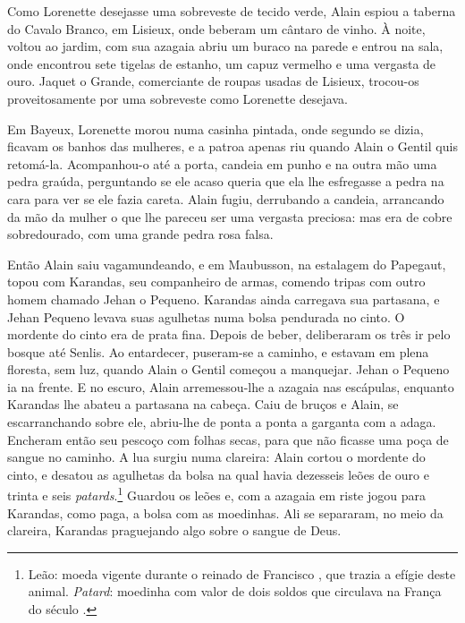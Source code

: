 Como Lorenette desejasse uma sobreveste de tecido verde, Alain espiou a
taberna do Cavalo Branco, em Lisieux, onde beberam um cântaro de vinho. À
noite, voltou ao jardim, com sua azagaia abriu um buraco na parede e
entrou na sala, onde encontrou sete tigelas de estanho, um capuz vermelho
e uma vergasta de ouro. Jaquet o Grande, comerciante de roupas usadas de
Lisieux, trocou-os proveitosamente por uma sobreveste como Lorenette
desejava.

Em Bayeux, Lorenette morou numa casinha pintada, onde segundo se dizia,
ficavam os banhos das mulheres, e a patroa apenas riu quando Alain o
Gentil quis retomá-la. Acompanhou-o até a porta, candeia em punho e na
outra mão uma pedra graúda, perguntando se ele acaso queria que ela lhe
esfregasse a pedra na cara para ver se ele fazia careta. Alain fugiu,
derrubando a candeia, arrancando da mão da mulher o que lhe pareceu ser
uma vergasta preciosa: mas era de cobre sobredourado, com uma grande pedra
rosa falsa.

Então Alain saiu vagamundeando, e em Maubusson, na estalagem do Papegaut,
topou com Karandas, seu companheiro de armas, comendo tripas com outro
homem chamado Jehan o Pequeno. Karandas ainda carregava sua partasana, e
Jehan Pequeno levava suas agulhetas numa bolsa pendurada no cinto. O
mordente do cinto era de prata fina. Depois de beber, deliberaram os três
ir pelo bosque até Senlis. Ao entardecer, puseram-se a caminho, e estavam
em plena floresta, sem luz, quando Alain o Gentil começou a manquejar.
Jehan o Pequeno ia na frente. E no escuro, Alain arremessou-lhe a azagaia
nas escápulas, enquanto Karandas lhe abateu a partasana na cabeça. Caiu de
bruços e Alain, se escarranchando sobre ele, abriu-lhe de ponta a ponta a
garganta com a adaga. Encheram então seu pescoço com folhas secas, para
que não ficasse uma poça de sangue no caminho. A lua surgiu numa clareira:
Alain cortou o mordente do cinto, e desatou as agulhetas da bolsa na qual
havia dezesseis leões de ouro e trinta e seis \textit{patards}.\footnote{
Leão: moeda vigente durante o reinado de Francisco , que trazia a efígie
deste animal. \textit{Patard}: moedinha com valor de dois soldos que
circulava na França do século .} Guardou os leões e, com a azagaia em
riste jogou para Karandas, como paga, a bolsa com as moedinhas. Ali se
separaram, no meio da clareira, Karandas praguejando algo sobre o sangue
de Deus.

